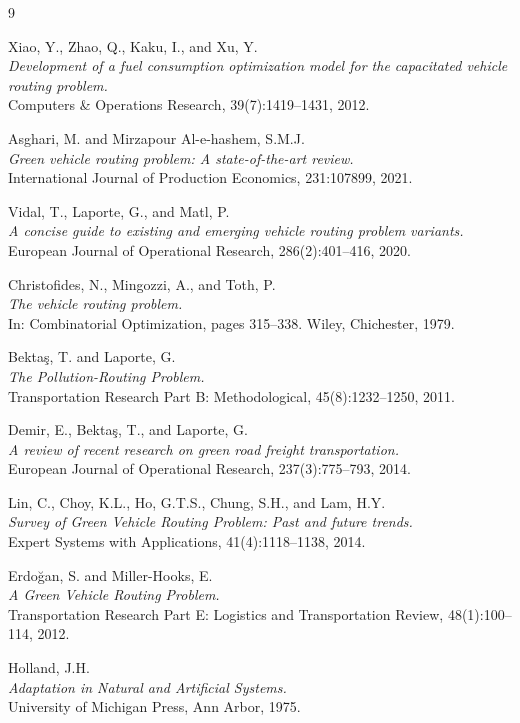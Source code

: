 \documentclass [a4paper, 11pt, titlepage] {article}
\begin{document}
\clearpage
\newpage
\label{litt}
\begin{thebibliography}{9}

Xiao, Y., Zhao, Q., Kaku, I., and Xu, Y. \\
\emph{Development of a fuel consumption optimization model for the capacitated vehicle routing problem.} \\
Computers \& Operations Research, 39(7):1419--1431, 2012.

Asghari, M. and Mirzapour Al-e-hashem, S.M.J. \\
\emph{Green vehicle routing problem: A state-of-the-art review.} \\
International Journal of Production Economics, 231:107899, 2021.

Vidal, T., Laporte, G., and Matl, P. \\
\emph{A concise guide to existing and emerging vehicle routing problem variants.} \\
European Journal of Operational Research, 286(2):401--416, 2020.

Christofides, N., Mingozzi, A., and Toth, P. \\
\emph{The vehicle routing problem.} \\
In: Combinatorial Optimization, pages 315--338. Wiley, Chichester, 1979.

Bektaş, T. and Laporte, G. \\
\emph{The Pollution-Routing Problem.} \\
Transportation Research Part B: Methodological, 45(8):1232--1250, 2011.

Demir, E., Bektaş, T., and Laporte, G. \\
\emph{A review of recent research on green road freight transportation.} \\
European Journal of Operational Research, 237(3):775--793, 2014.

Lin, C., Choy, K.L., Ho, G.T.S., Chung, S.H., and Lam, H.Y. \\
\emph{Survey of Green Vehicle Routing Problem: Past and future trends.} \\
Expert Systems with Applications, 41(4):1118--1138, 2014.

Erdoğan, S. and Miller-Hooks, E. \\
\emph{A Green Vehicle Routing Problem.} \\
Transportation Research Part E: Logistics and Transportation Review, 48(1):100--114, 2012.

Holland, J.H. \\
\emph{Adaptation in Natural and Artificial Systems.} \\
University of Michigan Press, Ann Arbor, 1975.

\end{thebibliography}
\end{document}
